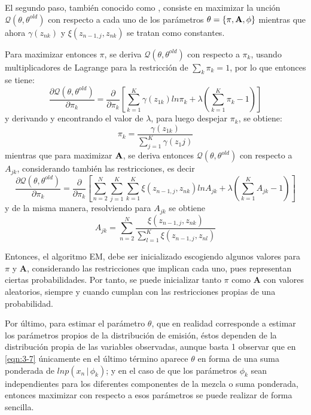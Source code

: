 El segundo paso, también conocido como \mstep, consiste en maximizar la unción $\mathcal{Q}(\theta, \theta^{old})$ con respecto a cada uno de los parámetros $\theta = \lbrace \pi, \textbf{A}, \phi \rbrace$ mientras que ahora $\gamma(z_{nk})$ y $\xi(z_{n-1,j}, z_{nk})$ se tratan como constantes.

Para maximizar entonces $\pi$, se deriva $\mathcal{Q}(\theta, \theta^{old})$ con respecto a $\pi_k$, usando multiplicadores de Lagrange para la restricción de $\sum_k \pi_k = 1$, por lo que entonces se tiene: 
\begin{equation*}
  \frac {\partial \mathcal{Q}(\theta, \theta^{old})}{\partial \pi_k} = 
  \frac {\partial}{\partial \pi_k} 
  \left[
    \sum_{k=1}^K \gamma(z_{1k}) ln \pi_k + \lambda (\sum_{k=1}^K \pi_k - 1) 
  \right]
\end{equation*}
y derivando y encontrando el valor de $\lambda$, para luego despejar $\pi_k$, se obtiene:
\begin{equation}
  \pi_k = \frac{\gamma(z_{1k})}{\sum_{j=1}^K \gamma(z_1j)}
\label{eqn:3-8}
\end{equation}
mientras que para maximizar $\textbf{A}$, se deriva entonces $\mathcal{Q}(\theta, \theta^{old})$ con respecto a $A_{jk}$, considerando también las restricciones, es decir
\begin{equation*}
  \frac {\partial \mathcal{Q}(\theta, \theta^{old})}{\partial \pi_k} = 
  \frac {\partial}{\partial \pi_k} 
  \left[
    \sum_{n=2}^N \sum_{j=1}^K \sum_{k=1}^K \xi(z_{n-1,j}, z_{nk}) ln A_{jk} 
    + \lambda (\sum_{k=1}^K A_{jk} - 1) 
  \right]
\end{equation*}
y de la misma manera, resolviendo para $A_{jk}$ se obtiene
\begin{equation}
A_{jk} = \sum_{n=2}^N 
  \frac{\xi(z_{n-1,j}, z_{nk})}
  {\sum_{l=1}^K \xi(z_{n-1,j}, z_{nl})}
\label{eqn:3-9}
\end{equation}

Entonces, el algoritmo \ac{EM}, debe ser inicializado escogiendo algunos valores para $\pi$ y $\mathbf{A}$, considerando las restricciones que implican cada uno, pues representan ciertas probabilidades. Por tanto, se puede inicializar tanto $\pi$ como $\mathbf{A}$ con valores aleatorios, siempre y cuando cumplan con las restricciones propias de una probabilidad. 

Por último, para estimar el parámetro $\theta$, que en realidad corresponde a estimar los parámetros propios de la distribución de emisión, éstos dependen de la distribución propia de las variables observadas, aunque basta 1 observar que en \eqref{eqn:3-7} únicamente en el último término aparece $\theta$ en forma de una suma ponderada de $ln p(x_n \,|\,  \phi_k)$; y en el caso de que los parámetros $\phi_k$ sean independientes para los diferentes componentes de la mezcla o suma ponderada, entonces maximizar con respecto a esos parámetros se puede realizar de forma sencilla.

